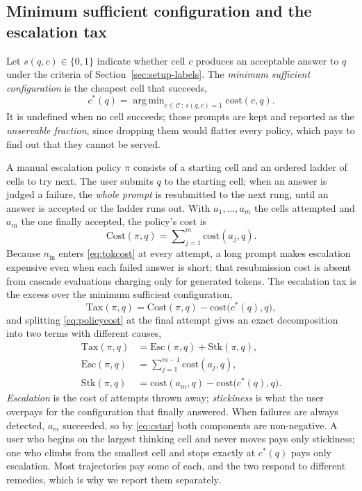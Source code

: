 \documentclass[final,5p,times,twocolumn]{elsarticle}
\theoremstyle{plain}
\newcommand{\cells}{\mathcal{C}}
\newcommand{\cstar}{c^{*}}
\newcommand{\cost}{\mathrm{cost}}
\newcommand{\Tax}{\mathrm{Tax}}
\newcommand{\Esc}{\mathrm{Esc}}
\newcommand{\Stk}{\mathrm{Stk}}
\DeclareMathOperator*{\argmin}{arg\,min}
\begin{document}
\subsection{Minimum sufficient configuration and the escalation tax}
\label{sec:tax}

Let $s(q, c) \in \{0, 1\}$ indicate whether cell $c$ produces an acceptable
answer to $q$ under the criteria of Section~\ref{sec:setup-labels}. The
\emph{minimum sufficient configuration} is the cheapest cell that succeeds,
\begin{equation}
  \cstar(q) = \argmin_{c \in \cells \,:\, s(q, c) = 1} \cost(c, q).
  \label{eq:cstar}
\end{equation}
It is undefined when no cell succeeds; those prompts are kept and reported as
the \emph{unservable fraction}, since dropping them would flatter every
policy, which pays to find out that they cannot be served.

A manual escalation policy $\pi$ consists of a starting cell and an ordered
ladder of cells to try next. The user submits $q$ to the starting cell; when
an answer is judged a failure, the \emph{whole prompt} is resubmitted to the
next rung, until an answer is accepted or the ladder runs out. With
$a_1, \dots, a_m$ the cells attempted and $a_m$ the one finally accepted, the
policy's cost is
\begin{equation}
  \mathrm{Cost}(\pi, q) = \sum\nolimits_{j=1}^{m} \cost(a_j, q).
  \label{eq:policycost}
\end{equation}
Because $n_{\mathrm{in}}$ enters \eqref{eq:tokcost} at every attempt, a long
prompt makes escalation expensive even when each failed answer is short; that
resubmission cost is absent from cascade evaluations charging only for
generated tokens. The escalation tax is the excess over the minimum
sufficient configuration,
\begin{equation}
  \Tax(\pi, q) = \mathrm{Cost}(\pi, q) - \cost\bigl(\cstar(q), q\bigr),
  \label{eq:tax}
\end{equation}
and splitting \eqref{eq:policycost} at the final attempt gives an exact
decomposition into two terms with different causes,
\begin{align}
  \Tax(\pi, q) &= \Esc(\pi, q) + \Stk(\pi, q), \label{eq:decomp}\\
  \Esc(\pi, q) &= \sum\nolimits_{j=1}^{m-1} \cost(a_j, q), \nonumber\\
  \Stk(\pi, q) &= \cost(a_m, q) - \cost\bigl(\cstar(q), q\bigr). \nonumber
\end{align}
\emph{Escalation} is the cost of attempts thrown away; \emph{stickiness} is
what the user overpays for the configuration that finally answered. When
failures are always detected, $a_m$ succeeded, so by \eqref{eq:cstar} both
components are non-negative. A user who begins on the largest thinking cell
and never moves pays only stickiness; one who climbs from the smallest cell
and stops exactly at $\cstar(q)$ pays only escalation. Most trajectories pay
some of each, and the two respond to different remedies, which is why we
report them separately.
\end{document}
